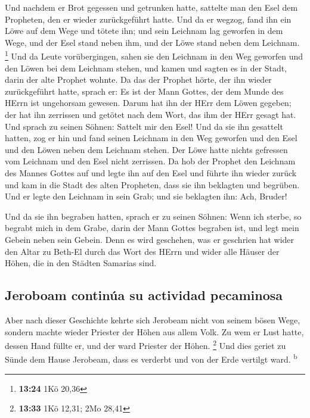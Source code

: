  Und nachdem er Brot gegessen und getrunken hatte,
sattelte man den Esel dem Propheten, den er wieder zurückgeführt hatte.
 Und da er wegzog, fand ihn ein Löwe auf dem Wege und
tötete ihn; und sein Leichnam lag geworfen in dem Wege, und der Esel
stand neben ihm, und der Löwe stand neben dem Leichnam. \footnote{\textbf{13:24}
  1Kö 20,36}  Und da Leute vorübergingen, sahen sie den
Leichnam in den Weg geworfen und den Löwen bei dem Leichnam stehen, und
kamen und sagten es in der Stadt, darin der alte Prophet wohnte.
 Da das der Prophet hörte, der ihn wieder zurückgeführt
hatte, sprach er: Es ist der Mann Gottes, der dem Munde des HErrn ist
ungehorsam gewesen. Darum hat ihn der HErr dem Löwen gegeben; der hat
ihn zerrissen und getötet nach dem Wort, das ihm der HErr gesagt hat.
 Und sprach zu seinen Söhnen: Sattelt mir den Esel! Und
da sie ihn gesattelt hatten,  zog er hin und fand seinen
Leichnam in den Weg geworfen und den Esel und den Löwen neben dem
Leichnam stehen. Der Löwe hatte nichts gefressen vom Leichnam und den
Esel nicht zerrissen.  Da hob der Prophet den Leichnam
des Mannes Gottes auf und legte ihn auf den Esel und führte ihn wieder
zurück und kam in die Stadt des alten Propheten, dass sie ihn beklagten
und begrüben.  Und er legte den Leichnam in sein Grab;
und sie beklagten ihn: Ach, Bruder!

 Und da sie ihn begraben hatten, sprach er zu seinen
Söhnen: Wenn ich sterbe, so begrabt mich in dem Grabe, darin der Mann
Gottes begraben ist, und legt mein Gebein neben sein Gebein.
 Denn es wird geschehen, was er geschrien hat wider den
Altar zu Beth-El durch das Wort des HErrn und wider alle Häuser der
Höhen, die in den Städten Samarias sind.

\hypertarget{jeroboam-continuxfaa-su-actividad-pecaminosa}{%
\subsection{Jeroboam continúa su actividad
pecaminosa}\label{jeroboam-continuxfaa-su-actividad-pecaminosa}}

 Aber nach dieser Geschichte kehrte sich Jerobeam nicht
von seinem bösen Wege, sondern machte wieder Priester der Höhen aus
allem Volk. Zu wem er Lust hatte, dessen Hand füllte er, und der ward
Priester der Höhen. \footnote{\textbf{13:33} 1Kö 12,31; 2Mo 28,41}
 Und dies geriet zu Sünde dem Hause Jerobeam, dass es
verderbt und von der Erde vertilgt ward. \textsuperscript{b}


